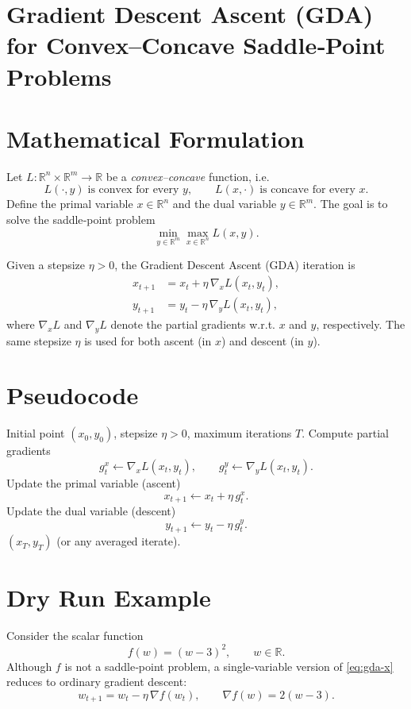 \documentclass{article}
\begin{document}
\section*{Gradient Descent Ascent (GDA) for Convex--Concave Saddle‑Point Problems}

\section*{Mathematical Formulation}
Let $L:\mathbb{R}^{n}\times\mathbb{R}^{m}\rightarrow\mathbb{R}$ be a \emph{convex–concave} function, i.e.
\[
L(\cdot ,y)\;\text{is convex for every }y,\qquad 
L(x,\cdot )\;\text{is concave for every }x .
\]
Define the primal variable $x\in\mathbb{R}^{n}$ and the dual variable $y\in\mathbb{R}^{m}$.  
The goal is to solve the saddle‑point problem
\[
\min_{y\in\mathbb{R}^{m}}\max_{x\in\mathbb{R}^{n}} L(x,y).
\]

Given a stepsize $\eta>0$, the Gradient Descent Ascent (GDA) iteration is
\begin{align}
x_{t+1}&=x_{t}+ \eta\,\nabla_{x} L(x_{t},y_{t}),\label{eq:gda-x}\\
y_{t+1}&=y_{t}- \eta\,\nabla_{y} L(x_{t},y_{t}),\label{eq:gda-y}
\end{align}
where $\nabla_{x}L$ and $\nabla_{y}L$ denote the partial gradients w.r.t. $x$ and $y$, respectively.
The same stepsize $\eta$ is used for both ascent (in $x$) and descent (in $y$).

\section*{Pseudocode}
\begin{algorithm}[H]
\caption{Gradient Descent Ascent (GDA)}\label{alg:gda}
\begin{algorithmic}[1]
\REQUIRE Initial point $(x_{0},y_{0})$, stepsize $\eta>0$, maximum iterations $T$.
    \STATE Compute partial gradients 
    \[
    g^{x}_{t}\gets \nabla_{x}L(x_{t},y_{t}),\qquad 
    g^{y}_{t}\gets \nabla_{y}L(x_{t},y_{t}).
    \]
    \STATE Update the primal variable (ascent)
    \[
    x_{t+1}\gets x_{t}+ \eta\, g^{x}_{t}.
    \]
    \STATE Update the dual variable (descent)
    \[
    y_{t+1}\gets y_{t}- \eta\, g^{y}_{t}.
    \]
\ENDFOR
\RETURN $(x_{T},y_{T})$ (or any averaged iterate).
\end{algorithmic}
\end{algorithm}

\section*{Dry Run Example}
Consider the scalar function 
\[
f(w)=(w-3)^{2},\qquad w\in\mathbb{R}.
\]
Although $f$ is not a saddle‑point problem, a single‑variable version of \eqref{eq:gda-x} reduces to ordinary gradient descent:
\[
w_{t+1}=w_{t}-\eta\,\nabla f(w_{t}),\qquad 
\nabla f(w)=2(w-3).
\]
\end{document}
